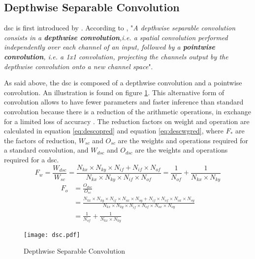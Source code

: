 \subsection{Depthwise Separable Convolution}  \label{subs:dsc}
\acrfull{dsc} is first introduced by \textcite{sifre_ecole_2014}. According to \textcite{chollet_xception_2017}, "\textit{A depthwise separable convolution consists in a \textbf{depthwise convolution},i.e. a spatial convolution performed independently over each channel of an input, followed by a \textbf{pointwise convolution}, i.e. a 1x1 convolution, projecting the channels output by the
depthwise convolution onto a new channel space}".

As said above, the \acrshort{dsc} is composed of a depthwise convolution and a pointwise convolution. An illustration is found on figure \ref{fig:dsc}. This alternative form of convolution allows to have fewer parameters and faster inference than standard convolution because there is a reduction of the arithmetic operations, in exchange for a limited loss of accuracy \cite{liu_fpga-based_2019}. The reduction factors on weight and operation are calculated in equation \eqref{eq:descopred} and equation \eqref{eq:descwgred}, where $F_{*}$ are the factors of reduction, $W_{sc}$ and $O_{sc}$ are the weights and operations required for a standard convolution, and $W_{dsc}$ and $O_{dsc}$ are the weights and operations required for a \acrshort{dsc}.
%
\begin{equation}
    F_w = \frac{W_{dsc}}{W_{sc}} =
    \frac{N_{kx} \times N_{ky} \times N_{if} + N_{if} \times N_{of}}{N_{kx} \times N_{ky} \times N_{if} \times N_{of}} =
    \frac{1}{N_{of}} + \frac{1}{N_{kx} \times N_{ky}}
    \label{eq:descopred}
\end{equation}
\begin{equation}
    \begin{split}
        F_o &= \frac{O_{dsc}}{O_{sc}} \\
        &= \frac{N_{kx} \times N_{ky} \times N_{if} \times N_{ox} \times N_{oy} + N_{if} \times N_{of} \times N_{ox} \times N_{oy}}{N_{kx} \times N_{ky} \times N_{if} \times N_{of} \times N_{ox} \times N_{oy}} \\
        &= \frac{1}{N_{of}} + \frac{1}{N_{kx} \times N_{ky}}
    \end{split}
    \label{eq:descwgred}
\end{equation}
%
\begin{figure}
    \texttt{[image: dsc.pdf]}
    \caption{Depthwise Separable Convolution}
    \label{fig:dsc}
\end{figure}
